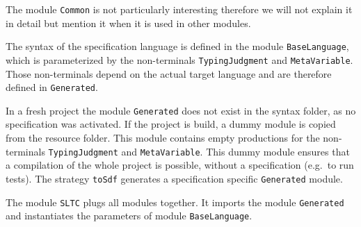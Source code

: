The module \verb|Common| is not particularly interesting therefore we
will not explain it in detail but mention it when it is used in other
modules.

The syntax of the specification language is defined in the module
\verb|BaseLanguage|, which is parameterized by the non-terminals
\verb|TypingJudgment| and \verb|MetaVariable|. Those non-terminals
depend on the actual target language and are therefore defined in
\verb|Generated|. 

In a fresh project the module \verb|Generated| does not exist in the
syntax folder, as no specification was activated. If the project is
build, a dummy module is copied from the resource folder. This module
contains empty productions for the non-terminals \verb|TypingJudgment|
and \verb|MetaVariable|. This dummy module ensures that a compilation
of the whole project is possible, without a specification (e.g.\ to
run tests). The strategy \verb|toSdf| generates a specification
specific \verb|Generated| module. 


The module \verb|SLTC| plugs all modules together. It imports the
module \verb|Generated| and instantiates the parameters of module
\verb|BaseLanguage|.

